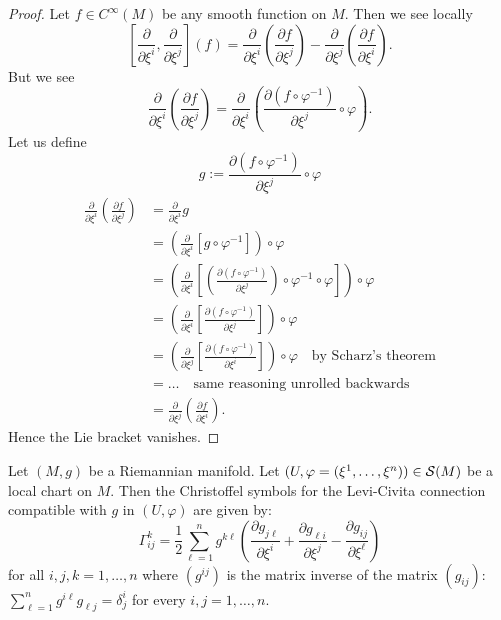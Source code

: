 \begin{proof}
Let $f\in C^{\infty}(M)$ be any smooth function on $M$. Then we see locally
\begin{equation}
\left[\frac{\partial}{\partial\xi^{i}},\frac{\partial}{\partial\xi^{j}}\right](f)=
\frac{\partial}{\partial\xi^{i}}\left(\frac{\partial f}{\partial\xi^{j}}\right)
-\frac{\partial}{\partial\xi^{j}}\left(\frac{\partial f}{\partial\xi^{i}}\right).
\end{equation}
But we see
\begin{equation}
\frac{\partial}{\partial\xi^{i}}\left(\frac{\partial f}{\partial\xi^{j}}\right)
=\frac{\partial}{\partial\xi^{i}}\left(\frac{\partial(f\circ\varphi^{-1})}{\partial\xi^{j}}\circ\varphi\right).
\end{equation}
Let us define
\begin{equation}
g:=\frac{\partial(f\circ\varphi^{-1})}{\partial\xi^{j}}\circ\varphi
\end{equation}
\begin{subequations}
  \begin{align}
\frac{\partial}{\partial\xi^{i}}\left(\frac{\partial f}{\partial\xi^{j}}\right)
&=\frac{\partial}{\partial\xi^{i}}g\\
&=\left(\frac{\partial}{\partial\xi^{i}}[g\circ\varphi^{-1}]\right)\circ\varphi\\
&=\left(\frac{\partial}{\partial\xi^{i}}\left[\left(\frac{\partial(f\circ\varphi^{-1})}{\partial\xi^{j}}\right)\circ\varphi^{-1}\circ\varphi\right]\right)\circ\varphi\\
&=\left(\frac{\partial}{\partial\xi^{i}}\left[\frac{\partial(f\circ\varphi^{-1})}{\partial\xi^{j}}\right]\right)\circ\varphi\\
&=\left(\frac{\partial}{\partial\xi^{j}}\left[\frac{\partial(f\circ\varphi^{-1})}{\partial\xi^{i}}\right]\right)\circ\varphi\quad\mbox{by Scharz's theorem}\\
&=\dots\quad\mbox{same reasoning unrolled backwards}\\
&=\frac{\partial}{\partial\xi^{j}}\left(\frac{\partial f}{\partial\xi^{i}}\right).
  \end{align}
\end{subequations}
Hence the Lie bracket vanishes.
\end{proof}

\begin{proposition}
Let $(M,g)$ be a Riemannian manifold. Let $(U,\varphi=(\xi^{1},\dots,\xi^{n}))\in\mathcal{S}(M)$
be a local chart on $M$. Then the Christoffel symbols for the
Levi-Civita connection compatible with $g$ in $(U,\varphi)$ are given by:
\begin{equation}
\Gamma^{k}_{ij}=\frac{1}{2}\sum^{n}_{\ell=1}g^{k\ell}\left(\frac{\partial g_{j\ell}}{\partial\xi^{i}}
  +\frac{\partial g_{\ell i}}{\partial\xi^{j}}
  -\frac{\partial g_{ij}}{\partial\xi^{\ell}}\right)
\end{equation}
for all $i,j,k=1,\dots,n$ where $(g^{ij})$ is the matrix inverse of
the matrix $(g_{ij})$: $\sum^{n}_{\ell=1}g^{i\ell}g_{\ell j}=\delta^{i}_{j}$
for every $i,j=1,\dots,n$.
\end{proposition}

